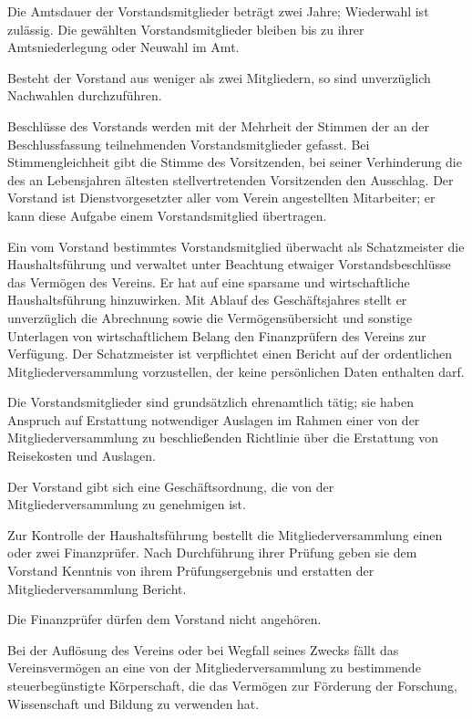 \documentclass[12pt,ngerman]{scrartcl}
\begin{document}
\begin{contract}
Die Amtsdauer der Vorstandsmitglieder beträgt zwei Jahre; Wiederwahl ist zulässig. Die gewählten Vorstandsmitglieder bleiben bis zu ihrer Amtsniederlegung oder Neuwahl im Amt.

Besteht der Vorstand aus weniger als zwei Mitgliedern, so sind unverzüglich Nachwahlen durchzuführen.

Beschlüsse des Vorstands werden mit der Mehrheit der Stimmen der an der Beschlussfassung teilnehmenden Vorstandsmitglieder gefasst. Bei Stimmengleichheit gibt die Stimme des Vorsitzenden, bei seiner Verhinderung die des an Lebensjahren ältesten stellvertretenden Vorsitzenden den Ausschlag. Der Vorstand ist Dienstvorgesetzter aller vom Verein angestellten Mitarbeiter; er kann diese Aufgabe einem Vorstandsmitglied übertragen.

Ein vom Vorstand bestimmtes Vorstandsmitglied überwacht als Schatzmeister die Haushaltsführung und verwaltet unter Beachtung etwaiger Vorstandsbeschlüsse das Vermögen des Vereins. Er hat auf eine sparsame und wirtschaftliche Haushaltsführung hinzuwirken. Mit Ablauf des Geschäftsjahres stellt er unverzüglich die Abrechnung sowie die Vermögensübersicht und sonstige Unterlagen von wirtschaftlichem Belang den Finanzprüfern des Vereins zur Verfügung. Der Schatzmeister ist verpflichtet einen Bericht auf der ordentlichen Mitgliederversammlung vorzustellen, der keine persönlichen Daten enthalten darf.

Die Vorstandsmitglieder sind grundsätzlich ehrenamtlich tätig; sie haben Anspruch auf Erstattung notwendiger Auslagen im Rahmen einer von der Mitgliederversammlung zu beschließenden Richtlinie über die Erstattung von Reisekosten und Auslagen.

Der Vorstand gibt sich eine Geschäftsordnung, die von der Mitgliederversammlung zu genehmigen ist.



Zur Kontrolle der Haushaltsführung bestellt die Mitgliederversammlung einen oder zwei Finanzprüfer. Nach Durchführung ihrer Prüfung geben sie dem Vorstand Kenntnis von ihrem Prüfungsergebnis und erstatten der Mitgliederversammlung Bericht.

Die Finanzprüfer dürfen dem Vorstand nicht angehören.


Bei der Auflösung des Vereins oder bei Wegfall seines Zwecks fällt das Vereinsvermögen an eine von der Mitgliederversammlung zu bestimmende steuerbegünstigte Körperschaft, die das Vermögen zur Förderung der Forschung, Wissenschaft und Bildung zu verwenden hat.


\end{contract}
\end{document}
